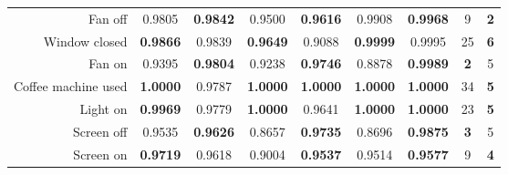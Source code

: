 \begin{table*}
\begin{center}
{\begin{tabular}{r|cc|cc|cc|cc}
				Fan off                                                  & 0.9805                              & \textbf{0.9842}                     & 0.9500                              & \textbf{0.9616}                     & 0.9908                              & \textbf{0.9968}                     & 9                                   & \textbf{2}                          \\
				Window closed                                            & \textbf{0.9866}                     & 0.9839                              & \textbf{0.9649}                     & 0.9088                              & \textbf{0.9999}                     & 0.9995                              & 25                                  & \textbf{6}                          \\
				Fan on                                                   & 0.9395                              & \textbf{0.9804}                     & 0.9238                              & \textbf{0.9746}                     & 0.8878                              & \textbf{0.9989}                     & \textbf{2}                          & 5                                   \\
				Coffee machine used                                      & \textbf{1.0000}                     & 0.9787                              & \textbf{1.0000}                     & \textbf{1.0000}                     & \textbf{1.0000}                     & \textbf{1.0000}                     & 34                                  & \textbf{5}                          \\
				Light on                                                 & \textbf{0.9969}                     & 0.9779                              & \textbf{1.0000}                     & 0.9641                              & \textbf{1.0000}                     & \textbf{1.0000}                     & 23                                  & \textbf{5}                          \\
				Screen off                                               & 0.9535                              & \textbf{0.9626}                     & 0.8657                              & \textbf{0.9735}                     & 0.8696                              & \textbf{0.9875}                     & \textbf{3}                          & 5                                   \\
				Screen on                                                & \textbf{0.9719}                     & 0.9618                              & 0.9004                              & \textbf{0.9537}                     & 0.9514                              & \textbf{0.9577}                     & 9                                   & \textbf{4}                          \\

\end{tabular}}
\end{center}
\end{table*}

